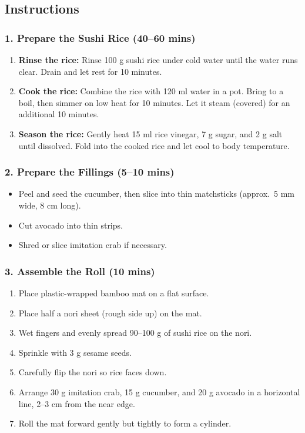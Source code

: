 \documentclass[landscape, a4paper]{article}
\newcommand\alert[1]{\textcolor{PrimaryColor}{\textbf{#1}}}
\begin{document}
\begin{minipage}[t]{0.31\textwidth}
	\vspace{0cm}
	\setlength{\parskip}{0.25cm}

	\subsection*{Instructions}
  \vspace{0.25cm}

	\subsubsection*{1. Prepare the Sushi Rice (40–60 mins)}
  \vspace{0.25cm}
	\begin{enumerate}
		\item \alert{Rinse the rice:} Rinse 100 g sushi rice under cold water until the water runs clear. Drain and let rest for 10 minutes.
		\item \alert{Cook the rice:} Combine the rice with 120 ml water in a pot. Bring to a boil, then simmer on low heat for 10 minutes. Let it steam (covered) for an additional 10 minutes.
		\item \alert{Season the rice:} Gently heat 15 ml rice vinegar, 7 g sugar, and 2 g salt until dissolved. Fold into the cooked rice and let cool to body temperature.
	\end{enumerate}

	\subsubsection*{2. Prepare the Fillings (5–10 mins)}
	\begin{itemize}
		\item Peel and seed the cucumber, then slice into thin matchsticks (approx.\ 5 mm wide, 8 cm long).
		\item Cut avocado into thin strips.
		\item Shred or slice imitation crab if necessary.
	\end{itemize}

	\subsubsection*{3. Assemble the Roll (10 mins)}
	\begin{enumerate}
		\item Place plastic-wrapped bamboo mat on a flat surface.
		\item Place half a nori sheet (rough side up) on the mat.
		\item Wet fingers and evenly spread 90–100 g of sushi rice on the nori.
		\item Sprinkle with 3 g sesame seeds.
		\item Carefully flip the nori so rice faces down.
		\item Arrange 30 g imitation crab, 15 g cucumber, and 20 g avocado in a horizontal line, 2–3 cm from the near edge.
		\item Roll the mat forward gently but tightly to form a cylinder.
	\end{enumerate}


\end{minipage}
\end{document}
